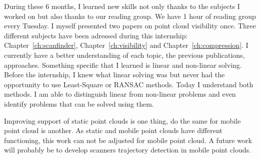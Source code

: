 During these 6 months, I learned new skills not only thanks to the subjects I worked on but also thanks to our reading group. We have 1 hour of reading group every Tuesday. I myself presented two papers on point cloud visibility once. Three different subjects have been adressed during this internship: Chapter~\ref{ch:scanfinder}, Chapter~\ref{ch:visibility} and Chapter~\ref{ch:compression}. I currently have a better understanding of each topic, the previous publications,
approaches. Something specific that I learned is linear and non-linear solving. Before the internship, I knew what linear solving was but never had the opportunity to use Least-Square or RANSAC methods. Today I understand both methods. I am able to distinguish linear from non-linear problems and even identify problems that can be solved using them.

Improving support of static point clouds is one thing, do the same for mobile point cloud is another. As static and mobile point clouds have different functioning, this work can not be adjusted for mobile point cloud. A future work will probably be to develop scanners trajectory detection in mobile point clouds.
